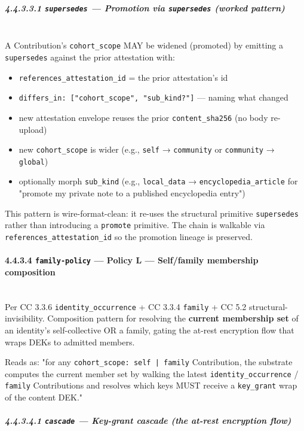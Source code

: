 \documentclass[11pt]{article}
\begin{document}
\subparagraph{4.4.3.3.1 \texttt{supersedes} — Promotion via \texttt{supersedes} (worked pattern)}\mbox{}\\


A Contribution's \texttt{cohort\_scope} MAY be widened (promoted) by emitting a \texttt{supersedes} against the prior attestation with:


\begin{itemize}\setlength\itemsep{0pt}
\item \texttt{references\_attestation\_id} = the prior attestation's id
\item \texttt{differs\_in: ["cohort\_scope", "sub\_kind?"]} — naming what changed
\item new attestation envelope reuses the prior \texttt{content\_sha256} (no body re-upload)
\item new \texttt{cohort\_scope} is wider (e.g., \texttt{self} → \texttt{community} or \texttt{community} → \texttt{global})
\item optionally morph \texttt{sub\_kind} (e.g., \texttt{local\_data} → \texttt{encyclopedia\_article} for "promote my private note to a published encyclopedia entry")
\end{itemize}


This pattern is wire-format-clean: it re-uses the structural primitive \texttt{supersedes} rather than introducing a \texttt{promote} primitive. The chain is walkable via \texttt{references\_attestation\_id} so the promotion lineage is preserved.


\paragraph{4.4.3.4 \texttt{family-policy} — Policy L — Self/family membership composition}\mbox{}\\


Per CC 3.3.6 \texttt{identity\_occurrence} + CC 3.3.4 \texttt{family} + CC 5.2 structural-invisibility. Composition pattern for resolving the \textbf{current membership set} of an identity's self-collective OR a family, gating the at-rest encryption flow that wraps DEKs to admitted members.


Reads as: "for any \texttt{cohort\_scope: self | family} Contribution, the substrate computes the current member set by walking the latest \texttt{identity\_occurrence} / \texttt{family} Contributions and resolves which keys MUST receive a \texttt{key\_grant} wrap of the content DEK."


\subparagraph{4.4.3.4.1 \texttt{cascade} — Key-grant cascade (the at-rest encryption flow)}\mbox{}\\
\end{document}
